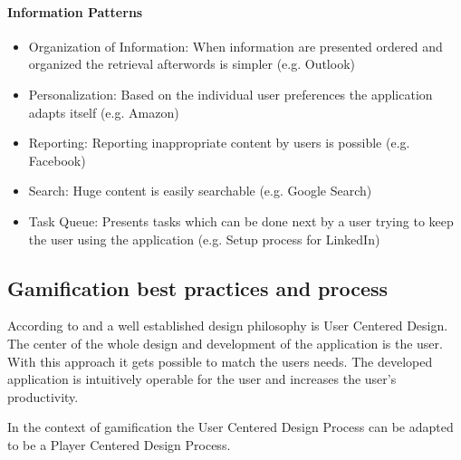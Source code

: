 \paragraph*{Information Patterns}
\begin{itemize}
	\item Organization of Information: When information are presented ordered and organized the retrieval afterwords is simpler (e.g. Outlook) \cite[p. 6, 85, 86]{lewisIrresistibleAppsMotivational2014}
	\item Personalization: Based on the individual user preferences the application adapts itself (e.g. Amazon) \cite[p. 6, 87]{lewisIrresistibleAppsMotivational2014}
	\item Reporting: Reporting inappropriate content by users is possible (e.g. Facebook) \cite[p. 6, 90]{lewisIrresistibleAppsMotivational2014}
	\item Search: Huge content is easily searchable (e.g. Google Search) \cite[p. 6, 90, 91]{lewisIrresistibleAppsMotivational2014}
	\item Task Queue: Presents tasks which can be done next by a user trying to keep the user using the application (e.g. Setup process for LinkedIn) \cite[p. 6, 93]{lewisIrresistibleAppsMotivational2014}
\end{itemize}


\subsection{Gamification best practices and process}
\label{sec:theoryBd}

According to \cite[p. 5, 6]{lowdermilkUsercenteredDesignDevelopers2013} and \cite[p. 27, 28]{inproceedings} a well established design philosophy is User Centered Design. The center of the whole design and development of the application is the user. With this approach it gets possible to match the users needs. The developed application is intuitively operable for the user and increases the user's productivity.

In the context of gamification the User Centered Design Process can be adapted to be a Player Centered Design Process.  

